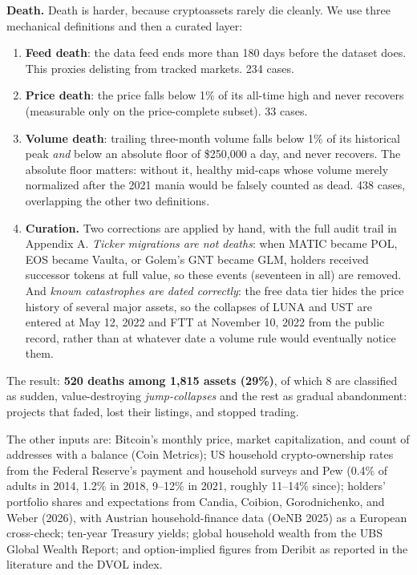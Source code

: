 \documentclass[11pt]{article}
\begin{document}
\textbf{Death.} Death is harder, because cryptoassets rarely die cleanly. We use three mechanical definitions and then a curated layer:
\begin{enumerate}
\item \textbf{Feed death}: the data feed ends more than 180 days before the dataset does. This proxies delisting from tracked markets. 234 cases.
\item \textbf{Price death}: the price falls below 1\% of its all-time high and never recovers (measurable only on the price-complete subset). 33 cases.
\item \textbf{Volume death}: trailing three-month volume falls below 1\% of its historical peak \emph{and} below an absolute floor of \$250{,}000 a day, and never recovers. The absolute floor matters: without it, healthy mid-caps whose volume merely normalized after the 2021 mania would be falsely counted as dead. 438 cases, overlapping the other two definitions.
\item \textbf{Curation.} Two corrections are applied by hand, with the full audit trail in Appendix A. \emph{Ticker migrations are not deaths}: when MATIC became POL, EOS became Vaulta, or Golem's GNT became GLM, holders received successor tokens at full value, so these events (seventeen in all) are removed. And \emph{known catastrophes are dated correctly}: the free data tier hides the price history of several major assets, so the collapses of LUNA and UST are entered at May 12, 2022 and FTT at November 10, 2022 from the public record, rather than at whatever date a volume rule would eventually notice them.
\end{enumerate}

The result: \textbf{520 deaths among 1,815 assets (29\%)}, of which 8 are classified as sudden, value-destroying \emph{jump-collapses} and the rest as gradual abandonment: projects that faded, lost their listings, and stopped trading.

The other inputs are: Bitcoin's monthly price, market capitalization, and count of addresses with a balance (Coin Metrics); US household crypto-ownership rates from the Federal Reserve's payment and household surveys and Pew (0.4\% of adults in 2014, 1.2\% in 2018, 9--12\% in 2021, roughly 11--14\% since); holders' portfolio shares and expectations from Candia, Coibion, Gorodnichenko, and Weber (2026), with Austrian household-finance data (OeNB 2025) as a European cross-check; ten-year Treasury yields; global household wealth from the UBS Global Wealth Report; and option-implied figures from Deribit as reported in the literature and the DVOL index.
\end{document}
